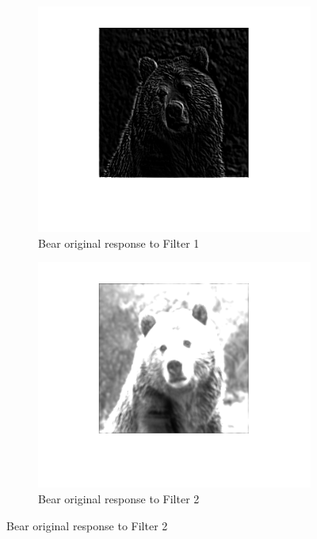 \documentclass[a4paper]{iacas}
\begin{document}
\vskip 0.1in
\begin{figure}

  \begin{subfigure}{0.4\linewidth}
	\includegraphics[width=\linewidth]{imgs/response_filt_1.png}
	\caption{Bear original response to Filter 1}
  \end{subfigure}
  \begin{subfigure}{0.4\linewidth}
	\includegraphics[width=\linewidth]{imgs/response_filt_2.png}
	\caption{Bear original response to Filter 2}
  \end{subfigure}



\end{figure}
\end{document}
